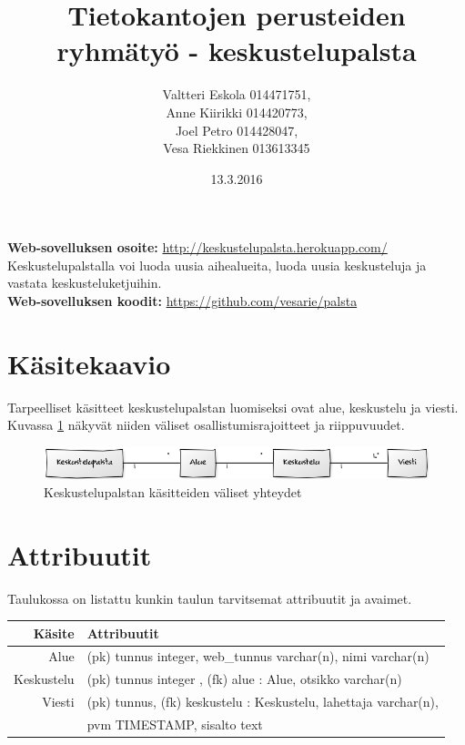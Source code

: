 \documentclass[titlepage]{article}
\title{Tietokantojen perusteiden ryhm\"aty\"o - keskustelupalsta}
\author{Valtteri Eskola 014471751, \\ Anne Kiirikki 014420773, \\ Joel Petro 014428047, \\ Vesa Riekkinen 013613345}
\date{13.3.2016}
\begin{document}
\maketitle

\noindent \textbf{Web-sovelluksen osoite:} \href{
http://keskustelupalsta.herokuapp.com/}{
http://keskustelupalsta.herokuapp.com/} \\
\noindent Keskustelupalstalla voi luoda uusia aihealueita, luoda uusia keskusteluja ja vastata keskusteluketjuihin.\\

\noindent \textbf{Web-sovelluksen koodit:} \href{https://github.com/vesarie/palsta}{https://github.com/vesarie/palsta}

\section*{Käsitekaavio}
Tarpeelliset käsitteet keskustelupalstan luomiseksi  ovat alue, keskustelu ja viesti. Kuvassa \ref{kasite} näkyvät niiden väliset osallistumisrajoitteet ja riippuvuudet.

\begin{figure}[H]
\includegraphics[width=\textwidth]{kasitekaavio}
\caption{Keskustelupalstan käsitteiden väliset yhteydet}
\label{kasite}
\end{figure}

\section*{Attribuutit}

\noindent Taulukossa on listattu kunkin taulun tarvitsemat attribuutit ja avaimet. \\

{
\centering
\begin{tabular}[width=\textwidth]{r|l}

Käsite & Attribuutit \\
\hline
Alue & (pk) tunnus integer, web{\_}tunnus varchar(n), nimi varchar(n) \\
Keskustelu & (pk) tunnus integer , (fk) alue : Alue,  otsikko varchar(n) \\
Viesti & (pk) tunnus, (fk) keskustelu : Keskustelu, lahettaja varchar(n), \\
& pvm TIMESTAMP, sisalto text \\
\end{tabular}
} \\
\end{document}
